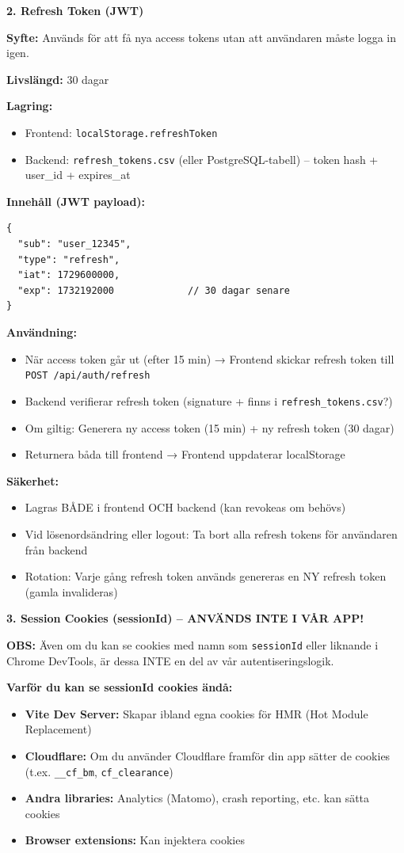 \documentclass[12pt,a4paper]{article}
\begin{document}
\textbf{2. Refresh Token (JWT)}

\textbf{Syfte:} Används för att få nya access tokens utan att användaren måste logga in igen.

\textbf{Livslängd:} 30 dagar

\textbf{Lagring:}
\begin{itemize}[noitemsep]
  \item Frontend: \texttt{localStorage.refreshToken}
  \item Backend: \texttt{refresh\_tokens.csv} (eller PostgreSQL-tabell) -- token hash + user\_id + expires\_at
\end{itemize}

\textbf{Innehåll (JWT payload):}
\begin{verbatim}
{
  "sub": "user_12345",
  "type": "refresh",
  "iat": 1729600000,
  "exp": 1732192000             // 30 dagar senare
}
\end{verbatim}

\textbf{Användning:}
\begin{itemize}[noitemsep]
  \item När access token går ut (efter 15 min) → Frontend skickar refresh token till \texttt{POST /api/auth/refresh}
  \item Backend verifierar refresh token (signature + finns i \texttt{refresh\_tokens.csv}?)
  \item Om giltig: Generera ny access token (15 min) + ny refresh token (30 dagar)
  \item Returnera båda till frontend → Frontend uppdaterar localStorage
\end{itemize}

\textbf{Säkerhet:}
\begin{itemize}[noitemsep]
  \item Lagras BÅDE i frontend OCH backend (kan revokeas om behövs)
  \item Vid lösenordsändring eller logout: Ta bort alla refresh tokens för användaren från backend
  \item Rotation: Varje gång refresh token används genereras en NY refresh token (gamla invalideras)
\end{itemize}

\textbf{3. Session Cookies (sessionId) -- ANVÄNDS INTE I VÅR APP!}

\textbf{OBS:} Även om du kan se cookies med namn som \texttt{sessionId} eller liknande i 
Chrome DevTools, är dessa INTE en del av vår autentiseringslogik.

\textbf{Varför du kan se sessionId cookies ändå:}
\begin{itemize}[noitemsep]
  \item \textbf{Vite Dev Server:} Skapar ibland egna cookies för HMR (Hot Module Replacement)
  \item \textbf{Cloudflare:} Om du använder Cloudflare framför din app sätter de cookies (t.ex. \texttt{\_\_cf\_bm}, \texttt{cf\_clearance})
  \item \textbf{Andra libraries:} Analytics (Matomo), crash reporting, etc. kan sätta cookies
  \item \textbf{Browser extensions:} Kan injektera cookies
\end{itemize}
\end{document}
